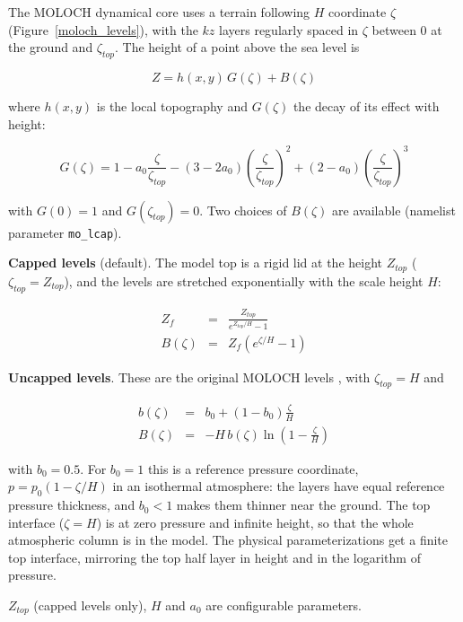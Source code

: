 The \ac{MOLOCH} dynamical core uses a terrain following $H$ coordinate
$\zeta$ (Figure~\ref{moloch_levels}), with the $kz$ layers regularly spaced
in $\zeta$ between 0 at the ground and $\zeta_{top}$. The height of a point
above the sea level is

\begin{equation}
  Z = h(x,y)\, G(\zeta) + B(\zeta)
\end{equation}

where $h(x,y)$ is the local topography and $G(\zeta)$ the decay of its
effect with height:

\begin{equation}
G(\zeta) = 1 - a_0 \frac{\zeta}{\zeta_{top}} -
       (3 - 2 a_0)\left( \frac{\zeta}{\zeta_{top}} \right)^2 +
       (2 - a_0) \left( \frac{\zeta}{\zeta_{top}} \right)^3
\end{equation}

with $G(0) = 1$ and $G(\zeta_{top}) = 0$. Two choices of $B(\zeta)$ are
available (namelist parameter \texttt{mo\_lcap}).

\textbf{Capped levels} (default). The model top is a rigid lid at the
height $Z_{top}$ ($\zeta_{top} = Z_{top}$), and the levels are stretched
exponentially with the scale height $H$:

\begin{eqnarray}
  Z_f &=& \frac{Z_{top}}{e^{Z_{top}/H}-1} \\
  B(\zeta) &=& Z_f \left( e^{\zeta/H} - 1 \right)
\end{eqnarray}

\textbf{Uncapped levels}. These are the original \ac{MOLOCH} levels
\citep{Malguzzi_11}, with $\zeta_{top} = H$ and

\begin{eqnarray}
  b(\zeta) &=& b_0 + (1 - b_0)\frac{\zeta}{H} \\
  B(\zeta) &=& -H\, b(\zeta) \ln\left(1 - \frac{\zeta}{H}\right)
\end{eqnarray}

with $b_0 = 0.5$. For $b_0 = 1$ this is a reference pressure coordinate,
$p = p_0 (1 - \zeta/H)$ in an isothermal atmosphere: the layers have equal
reference pressure thickness, and $b_0 < 1$ makes them thinner near the
ground. The top interface ($\zeta = H$) is at zero pressure and infinite
height, so that the whole atmospheric column is in the model. The physical
parameterizations get a finite top interface, mirroring the top half layer
in height and in the logarithm of pressure.

$Z_{top}$ (capped levels only), $H$ and $a_0$ are configurable parameters.

